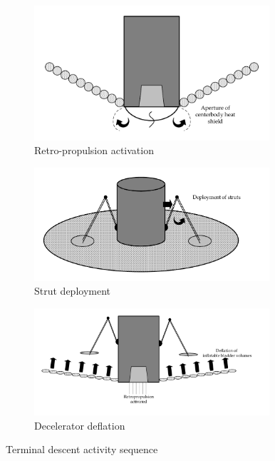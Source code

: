 \begin{figure}[ht]
	\centering
	\begin{subfigure}[b]{0.44\textwidth}
		\includegraphics[width=0.96\textwidth]{./Figure/CrewModule/TDa.pdf}
		\caption{Retro-propulsion activation}
		\label{fig:retroprop}
	\end{subfigure}
		\begin{subfigure}[b]{0.55\textwidth}
		\centering
			\includegraphics[width=0.96\textwidth]{./Figure/CrewModule/TDb.pdf}
			\caption{Strut deployment}
			\label{fig:strut}
		\end{subfigure}
	\begin{subfigure}[b]{0.54\textwidth}
		\includegraphics[width=0.96\textwidth]{./Figure/CrewModule/TDc.pdf}
		\vspace{-4.5mm}
		\caption{Decelerator deflation}
		\label{fig:deflation}
	\end{subfigure}
		\caption{Terminal descent activity sequence}
	\label{fig:tdseq}
\end{figure}


